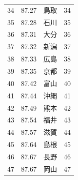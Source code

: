 \begin{table}[ht]
\begin{tabular}{rrlr}
  34 & 87.27 & 鳥取 &  34 \\
  35 & 87.28 & 石川 &  35 \\
  36 & 87.31 & 大分 &  36 \\
  37 & 87.32 & 新潟 &  37 \\
  38 & 87.33 & 広島 &  38 \\
  39 & 87.35 & 京都 &  39 \\
  40 & 87.42 & 富山 &  40 \\
  41 & 87.44 & 沖縄 &  41 \\
  42 & 87.49 & 熊本 &  42 \\
  43 & 87.54 & 福井 &  43 \\
  44 & 87.57 & 滋賀 &  44 \\
  45 & 87.64 & 島根 &  45 \\
  46 & 87.67 & 長野 &  46 \\
  47 & 87.67 & 岡山 &  47 \\
   \hline
\end{tabular}
\end{table}






